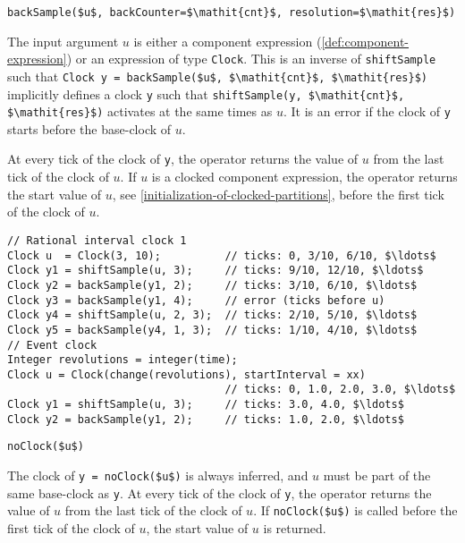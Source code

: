\begin{operatordefinition}[backSample]
\begin{synopsis}\begin{lstlisting}
backSample($u$, backCounter=$\mathit{cnt}$, resolution=$\mathit{res}$)
\end{lstlisting}\end{synopsis}
\begin{semantics}
The input argument $u$ is either a component expression (\cref{def:component-expression}) or an expression of type \lstinline!Clock!.
This is an inverse of \lstinline!shiftSample! such that \lstinline!Clock y = backSample($u$, $\mathit{cnt}$, $\mathit{res}$)! implicitly defines a clock \lstinline!y! such that \lstinline!shiftSample(y, $\mathit{cnt}$, $\mathit{res}$)! activates at the same times as $u$.
It is an error if the clock of \lstinline!y! starts before the base-clock of $u$.

At every tick of the clock of \lstinline!y!, the operator returns the value of $u$ from the last tick of the clock of $u$.
If $u$ is a clocked component expression, the operator returns the start value of $u$, see \cref{initialization-of-clocked-partitions}, before the first tick of the clock of $u$.

\begin{example}
\begin{lstlisting}[language=modelica]
// Rational interval clock 1
Clock u  = Clock(3, 10);          // ticks: 0, 3/10, 6/10, $\ldots$
Clock y1 = shiftSample(u, 3);     // ticks: 9/10, 12/10, $\ldots$
Clock y2 = backSample(y1, 2);     // ticks: 3/10, 6/10, $\ldots$
Clock y3 = backSample(y1, 4);     // error (ticks before u)
Clock y4 = shiftSample(u, 2, 3);  // ticks: 2/10, 5/10, $\ldots$
Clock y5 = backSample(y4, 1, 3);  // ticks: 1/10, 4/10, $\ldots$
// Event clock
Integer revolutions = integer(time);
Clock u = Clock(change(revolutions), startInterval = xx)
                                  // ticks: 0, 1.0, 2.0, 3.0, $\ldots$
Clock y1 = shiftSample(u, 3);     // ticks: 3.0, 4.0, $\ldots$
Clock y2 = backSample(y1, 2);     // ticks: 1.0, 2.0, $\ldots$
\end{lstlisting}
\end{example}
\end{semantics}
\end{operatordefinition}

\begin{operatordefinition}[noClock]
\begin{synopsis}\begin{lstlisting}
noClock($u$)
\end{lstlisting}\end{synopsis}
\begin{semantics}
The clock of \lstinline!y = noClock($u$)! is always inferred, and $u$ must be part of the same base-clock as \lstinline!y!.  At every tick of the clock of \lstinline!y!, the operator returns the value of $u$ from the last tick of the clock of $u$.  If \lstinline!noClock($u$)! is called before the first tick of the clock of $u$, the start value of $u$ is returned.
\end{semantics}
\end{operatordefinition}

